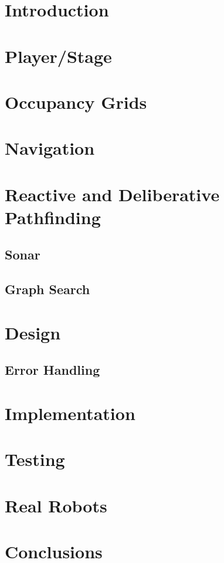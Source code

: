 \documentclass[a4paper,12pt]{article}
\begin{document}

\thispagestyle{empty} %
\tableofcontents %
\clearpage
{} %

\section{Introduction}
\section{Player/Stage}
\section{Occupancy Grids}
\section{Navigation}
\section{Reactive and Deliberative Pathfinding}
\subsection{Sonar}
\subsection{Graph Search}
\section{Design}
\subsection{Error Handling}
\section{Implementation}
\section{Testing}
\section{Real Robots}
\section{Conclusions}
\end{document}

